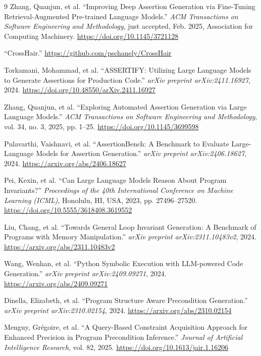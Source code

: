 \documentclass[8pt]{extarticle}
\begin{document}
\begin{thebibliography}{9}
 Zhang, Quanjun, et al. ``Improving Deep Assertion Generation via Fine-Tuning Retrieval-Augmented Pre-trained Language Models.'' \textit{ACM Transactions on Software Engineering and Methodology}, just accepted, Feb. 2025, Association for Computing Machinery. \url{https://doi.org/10.1145/3721128}

 ``CrossHair.'' \url{https://github.com/pschanely/CrossHair}

 Torkamani, Mohammad, et al. ``ASSERTIFY: Utilizing Large Language Models to Generate Assertions for Production Code.'' \textit{arXiv preprint arXiv:2411.16927}, 2024. \url{https://doi.org/10.48550/arXiv.2411.16927}

 Zhang, Quanjun, et al. ``Exploring Automated Assertion Generation via Large Language Models.'' \textit{ACM Transactions on Software Engineering and Methodology}, vol. 34, no. 3, 2025, pp. 1--25. \url{https://doi.org/10.1145/3699598}

 Pulavarthi, Vaishnavi, et al. ``AssertionBench: A Benchmark to Evaluate Large-Language Models for Assertion Generation.'' \textit{arXiv preprint arXiv:2406.18627}, 2024. \url{https://arxiv.org/abs/2406.18627}

 Pei, Kexin, et al. ``Can Large Language Models Reason About Program Invariants?'' \textit{Proceedings of the 40th International Conference on Machine Learning (ICML)}, Honolulu, HI, USA, 2023, pp. 27496--27520. \url{https://doi.org/10.5555/3618408.3619552}

 Liu, Chang, et al. ``Towards General Loop Invariant Generation: A Benchmark of Programs with Memory Manipulation.'' \textit{arXiv preprint arXiv:2311.10483v2}, 2024. \url{https://arxiv.org/abs/2311.10483v2}

 Wang, Wenhan, et al. ``Python Symbolic Execution with LLM-powered Code Generation.'' \textit{arXiv preprint arXiv:2409.09271}, 2024. \url{https://arxiv.org/abs/2409.09271}

 Dinella, Elizabeth, et al. ``Program Structure Aware Precondition Generation.'' \textit{arXiv preprint arXiv:2310.02154}, 2024. \url{https://arxiv.org/abs/2310.02154}

 Menguy, Grégoire, et al. ``A Query-Based Constraint Acquisition Approach for Enhanced Precision in Program Precondition Inference.'' \textit{Journal of Artificial Intelligence Research}, vol. 82, 2025. \url{https://doi.org/10.1613/jair.1.16206}


\end{thebibliography}
\end{document}
